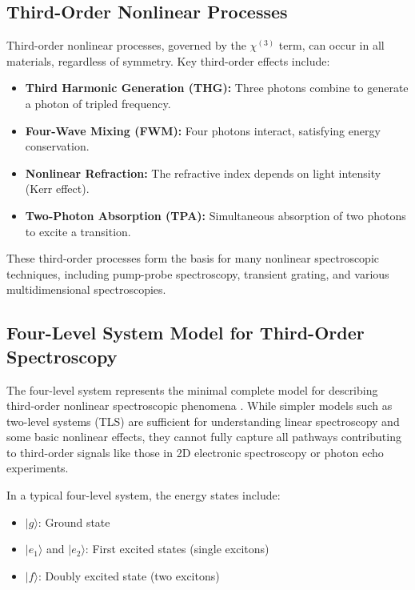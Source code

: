 \subsection{Third-Order Nonlinear Processes}
\label{subsec:third_order}

\noindent Third-order nonlinear processes, governed by the $\chi^{(3)}$ term, can occur in all materials, regardless of symmetry. Key third-order effects include:

\begin{itemize}
    \item \textbf{Third Harmonic Generation (THG):} Three photons combine to generate a photon of tripled frequency.
    \item \textbf{Four-Wave Mixing (FWM):} Four photons interact, satisfying energy conservation.
    \item \textbf{Nonlinear Refraction:} The refractive index depends on light intensity (Kerr effect).
    \item \textbf{Two-Photon Absorption (TPA):} Simultaneous absorption of two photons to excite a transition.
\end{itemize}

\noindent These third-order processes form the basis for many nonlinear spectroscopic techniques, including pump-probe spectroscopy, transient grating, and various multidimensional spectroscopies.

\subsection{Four-Level System Model for Third-Order Spectroscopy}
\label{subsec:four_level_model}

\noindent The four-level system represents the minimal complete model for describing third-order nonlinear spectroscopic phenomena \cite{Cho2009TwodimensionalOpticalSpectroscopy, AbramaviciusEtAl2009CoherentMultidimensionalOptical}. While simpler models such as two-level systems (TLS) are sufficient for understanding linear spectroscopy and some basic nonlinear effects, they cannot fully capture all pathways contributing to third-order signals like those in 2D electronic spectroscopy or photon echo experiments.

\noindent In a typical four-level system, the energy states include:

\begin{itemize}
    \item $|g\rangle$: Ground state
    \item $|e_1\rangle$ and $|e_2\rangle$: First excited states (single excitons)
    \item $|f\rangle$: Doubly excited state (two excitons)
\end{itemize}

